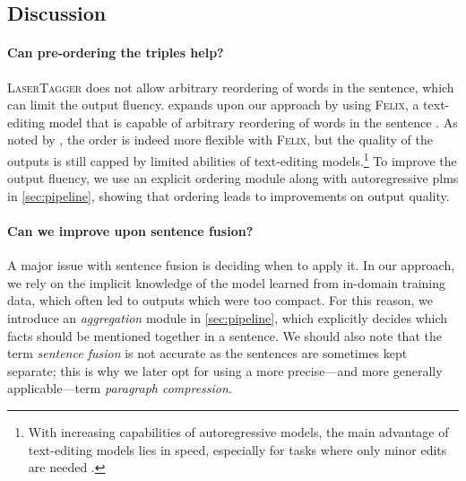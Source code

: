 \subsection{Discussion}

\paragraph{Can pre-ordering the triples help?} \textsc{LaserTagger} does not allow arbitrary reordering of words in the sentence, which can limit the output fluency. \citet{grajcar2023data} expands upon our approach by using \textsc{Felix}, a text-editing model that is capable of arbitrary reordering of words in the sentence \cite{mallinsonFelixFlexibleText2020}. As noted by \citet{grajcar2023data}, the order is indeed more flexible with \textsc{Felix}, but the quality of the outputs is still capped by limited abilities of text-editing models.\footnote{With increasing capabilities of autoregressive models, the main advantage of text-editing models lies in speed, especially for tasks where only minor edits are needed \cite{malmi2022text}.} To improve the output fluency, we use an explicit ordering module along with autoregressive \acp{plm} in \autoref{sec:pipeline}, showing that ordering leads to improvements on output quality.

\paragraph{Can we improve upon sentence fusion?} A major issue with sentence fusion is deciding when to apply it. In our approach, we rely on the implicit knowledge of the model learned from in-domain training data, which often led to outputs which were too compact. For this reason, we introduce an \emph{aggregation} module in \autoref{sec:pipeline}, which explicitly decides which facts should be mentioned together in a sentence. We should also note that the term \emph{sentence fusion} is not accurate as the sentences are sometimes kept separate; this is why we later opt for using a more precise---and more generally applicable---term \emph{paragraph compression}.


